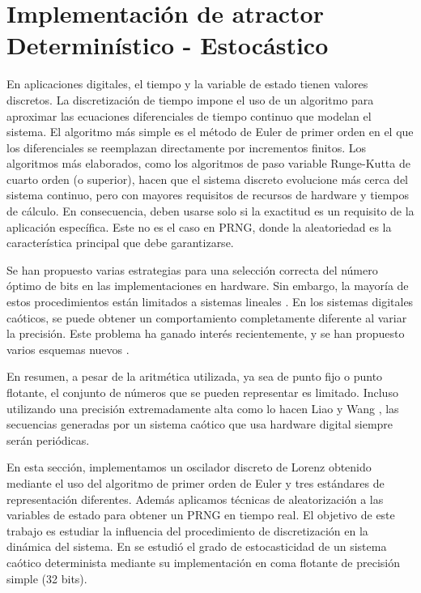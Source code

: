 \section{Implementación de atractor Determinístico - Estocástico}
\label{sec:AnalysisImpLorenz}

En aplicaciones digitales, el tiempo y la variable de estado tienen valores discretos.
La discretización de tiempo impone el uso de un algoritmo para aproximar las ecuaciones diferenciales de tiempo continuo que modelan el sistema.
El algoritmo más simple es el método de Euler de primer orden en el que los diferenciales se reemplazan directamente por incrementos finitos.
Los algoritmos más elaborados, como los algoritmos de paso variable Runge-Kutta de cuarto orden (o superior), hacen que el sistema discreto evolucione más cerca del sistema continuo, pero con mayores requisitos de recursos de hardware y tiempos de cálculo.
En consecuencia, deben usarse solo si la exactitud es un requisito de la aplicación específica.
Este no es el caso en PRNG, donde la aleatoriedad es la característica principal que debe garantizarse.

Se han propuesto varias estrategias para una selección correcta del número óptimo de bits en las implementaciones en hardware.
Sin embargo, la mayoría de estos procedimientos están limitados a sistemas lineales \cite{Constantinides2002, Constantinides2003}.
En los sistemas digitales caóticos, se puede obtener un comportamiento completamente diferente al variar la precisión.
Este problema ha ganado interés recientemente, y se han propuesto varios esquemas nuevos \cite{Ding2007, Asseri2002, Azzaz2009}.

En resumen, a pesar de la aritmética utilizada, ya sea de punto fijo o punto flotante, el conjunto de números que se pueden representar es limitado.
Incluso utilizando una precisión extremadamente alta como lo hacen Liao y Wang \cite{Liao2013a}, las secuencias generadas por un sistema caótico que usa hardware digital siempre serán periódicas.

En esta sección, implementamos un oscilador discreto de Lorenz obtenido mediante el uso del algoritmo de primer orden de Euler y tres estándares de representación diferentes.
Además aplicamos técnicas de aleatorización a las variables de estado para obtener un PRNG en tiempo real.
El objetivo de este trabajo es estudiar la influencia del procedimiento de discretización en la dinámica del sistema.
En \cite{DeMicco2010} se estudió el grado de estocasticidad de un sistema caótico determinista mediante su implementación en coma flotante de precisión simple (32 bits).

